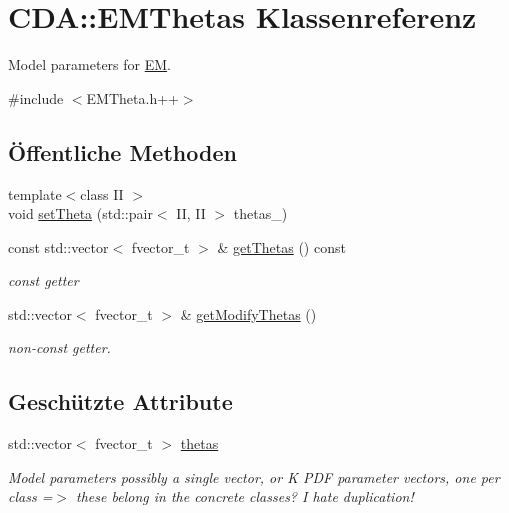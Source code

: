 \hypertarget{classCDA_1_1EMThetas}{
\section{CDA::EMThetas Klassenreferenz}
\label{classCDA_1_1EMThetas}
}


Model parameters for \hyperlink{classCDA_1_1EM}{EM}.  




{\ttfamily \#include $<$EMTheta.h++$>$}

\subsection*{Öffentliche Methoden}
\begin{DoxyCompactItemize}
\item 
{\footnotesize template$<$class II $>$ }\\void \hyperlink{classCDA_1_1EMThetas_a1c8058269e4d8a32a2dd58f13ad94369}{setTheta} (std::pair$<$ II, II $>$ thetas\_\-)
\item 
\hypertarget{classCDA_1_1EMThetas_aadd9127ef459eda6eb890e1f3bd5a1bc}{
const std::vector$<$ fvector\_\-t $>$ \& \hyperlink{classCDA_1_1EMThetas_aadd9127ef459eda6eb890e1f3bd5a1bc}{getThetas} () const }
\label{classCDA_1_1EMThetas_aadd9127ef459eda6eb890e1f3bd5a1bc}

\begin{DoxyCompactList}\small\item\em const getter \item\end{DoxyCompactList}\item 
\hypertarget{classCDA_1_1EMThetas_ab5cc3d05862d41aa16a38b7c4ec51bd3}{
std::vector$<$ fvector\_\-t $>$ \& \hyperlink{classCDA_1_1EMThetas_ab5cc3d05862d41aa16a38b7c4ec51bd3}{getModifyThetas} ()}
\label{classCDA_1_1EMThetas_ab5cc3d05862d41aa16a38b7c4ec51bd3}

\begin{DoxyCompactList}\small\item\em non-\/const getter. \item\end{DoxyCompactList}\end{DoxyCompactItemize}
\subsection*{Geschützte Attribute}
\begin{DoxyCompactItemize}
\item 
\hypertarget{classCDA_1_1EMThetas_a2fb1c00c889f9a5bfe95e65ba1c4b132}{
std::vector$<$ fvector\_\-t $>$ \hyperlink{classCDA_1_1EMThetas_a2fb1c00c889f9a5bfe95e65ba1c4b132}{thetas}}
\label{classCDA_1_1EMThetas_a2fb1c00c889f9a5bfe95e65ba1c4b132}

\begin{DoxyCompactList}\small\item\em Model parameters possibly a single vector, or K PDF parameter vectors, one per class =$>$ these belong in the concrete classes? I hate duplication! \item\end{DoxyCompactList}\end{DoxyCompactItemize}


